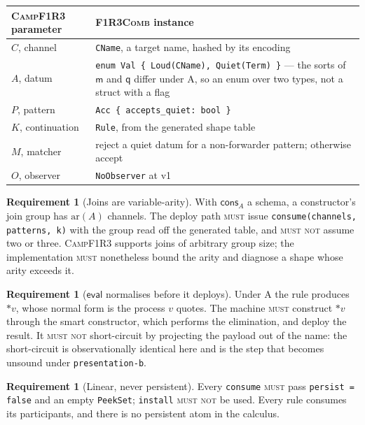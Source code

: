 \documentclass[11pt,a4paper]{article}
\newcommand{\code}[1]{\texttt{#1}}
\newcommand{\Comb}{\textsc{F1R3Comb}}
\newcommand{\Camp}{\textsc{CampF1R3}}
\newcommand{\MUST}{\textsc{must}}
\newcommand{\MUSTNOT}{\textsc{must not}}
\newcommand{\drp}[1]{{*}#1}
\newcommand{\mm}{\mathsf{m}}
\newcommand{\qq}{\mathsf{q}}
\newcommand{\cons}{\mathsf{cons}}
\theoremstyle{definition}
\newtheorem{requirement}[definition]{Requirement}
\theoremstyle{plain}
\begin{document}
\begin{center}
\begin{tabularx}{\linewidth}{@{}l>{\raggedright\arraybackslash}X@{}}
\toprule
\Camp{} parameter & \Comb{} instance\\
\midrule
$C$, channel & \code{CName}, a target name, hashed by its encoding\\
$A$, datum & \code{enum Val \{ Loud(CName), Quiet(Term) \}} --- the sorts of
$\mm$ and $\qq$ differ under A, so an enum over two types, not a struct with a
flag\\
$P$, pattern & \code{Acc \{ accepts\_quiet: bool \}}\\
$K$, continuation & \code{Rule}, from the generated shape table\\
$M$, matcher & reject a quiet datum for a non-forwarder pattern; otherwise
accept\\
$O$, observer & \code{NoObserver} at v1\\
\bottomrule
\end{tabularx}
\end{center}

\begin{requirement}[Joins are variable-arity]\label{req:joins}
With $\cons_{A}$ a schema, a constructor's join group has $\mathrm{ar}(A)$
channels. The deploy path \MUST{} issue
\code{consume(channels, patterns, k)} with the group read off the generated
table, and \MUSTNOT{} assume two or three. \Camp{} supports joins of arbitrary
group size; the implementation \MUST{} nonetheless bound the arity and
diagnose a shape whose arity exceeds it.
\end{requirement}

\begin{requirement}[$\mathsf{eval}$ normalises before it deploys]
\label{req:evalnorm}
Under A the rule produces $\drp{v}$, whose normal form is the process $v$
quotes. The machine \MUST{} construct $\drp{v}$ through the smart constructor,
which performs the elimination, and deploy the result. It \MUSTNOT{}
short-circuit by projecting the payload out of the name: the short-circuit is
observationally identical here and is the step that becomes unsound under
\code{presentation-b}.
\end{requirement}

\begin{requirement}[Linear, never persistent]\label{req:linear}
Every \code{consume} \MUST{} pass \code{persist = false} and an empty
\code{PeekSet}; \code{install} \MUSTNOT{} be used. Every rule consumes its
participants, and there is no persistent atom in the calculus.
\end{requirement}
\end{document}
